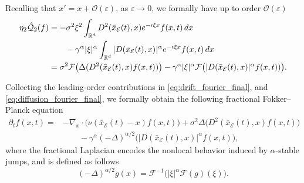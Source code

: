 \documentclass[11pt,handout]{article}%
\numberwithin{equation}{section}
\theoremstyle{definition}
\begin{document}
Recalling that $x' = x + \mathcal{O}(\varepsilon)$, as $\varepsilon\to 0$, we formally have up to order $\mathcal{O}(\varepsilon)$
\begin{align}\label{eq:diffusion_fourier_final}
	\eta_2 \hat{\mathcal{Q}}_2(f)
	&= -\sigma^2 \xi^2 
	\int_{\mathbb{R}^d} D^2(\bar{x}_\mathcal{E}(t),x) e^{-\imath \xi x} f(x,t)\,dx\\ & \qquad - \gamma^\alpha \vert\xi\vert^\alpha 
	\int_{\mathbb{R}^d} \vert D(\bar{x}_\mathcal{E}(t),x)\vert^\alpha e^{-\imath \xi x} f(x,t)\,dx\cr 
	&=\sigma^2 \mathcal{F}\big(\Delta(D^2(\bar{x}_\mathcal{E}(t),x) f(x,t))\big) - \gamma^\alpha \vert \xi \vert^\alpha  \mathcal{F}\big(\vert D(\bar{x}_\mathcal{E}(t),x)\vert^\alpha f(x,t))\big).
\end{align}

Collecting the leading-order contributions in \eqref{eq:drift_fourier_final}, and \eqref{eq:diffusion_fourier_final}, we formally obtain the  following fractional Fokker--Planck equation
\begin{equation}\label{eq:fFP}
	\begin{aligned}
		\partial_t f(x,t) = 
		& - \nabla_x \cdot \big(\nu(\bar{x}_\mathcal{E}(t)-x) f(x,t)\big) + \sigma^2 \Delta\big(D^2(\bar{x}_\mathcal{E}(t),x) f(x,t)\big) \\
		& 
		\qquad - \gamma^{\alpha} (-\Delta)^{\alpha/2}\big(|D(\bar{x}_\mathcal{E}(t),x)|^\alpha f(x,t)\big),
	\end{aligned}
\end{equation}
where the fractional Laplacian encodes the nonlocal behavior induced by $\alpha$-stable jumps, and is defined as follows
\[
(-\Delta)^{\alpha/2} g(x) = \mathcal{F}^{-1}\big(|\xi|^\alpha \mathcal{F}(g)(\xi)\big).
\]
\end{document}

